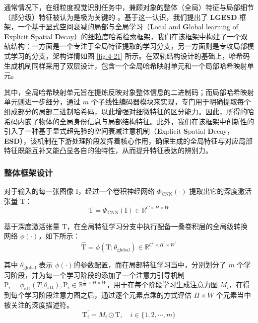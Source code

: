 通常情况下，在细粒度视觉识别任务中，兼顾对象的整体（全局）特征与局部细节（部分级）特征被认为是极为关键的 \cite{wei2021finegrained}。基于这一认识，我们提出了 \textbf{LGESD} 框架，一个基于显式空间衰减的局部与全局学习（\textbf{L}ocal and \textbf{G}lobal learning of \textbf{E}xplicit \textbf{S}patial \textbf{D}ecay）的细粒度哈希检索框架，我们在该框架中构建了一个双轨结构：一方面是一个专注于全局特征提取的学习分支，另一方面则是专攻局部模式学习的分支，架构详情如图 \ref{fig:4-21} 所示。在双轨结构设计的基础上，哈希码生成机制同样采用了双层设计，包含一个全局哈希映射单元和一个局部哈希映射单元。

其中，全局哈希映射单元旨在提炼反映对象整体信息的二进制码；而局部哈希映射单元则进一步细分，通过 $m$ 个子线性编码器模块来实现，专门用于明确提取每个组成部分的局部二进制哈希码，以此增强对细微特征的区分能力。因此，所得的哈希码内嵌了物体的全局身份信息与局部结构特征。此外，我们在该框架中创新性的引入了一种基于显式超先验的空间衰减注意机制（\textbf{E}xplicit \textbf{S}patial \textbf{D}ecay，\textbf{ESD}），该机制在下游处理阶段发挥着核心作用，确保生成的全局特征与对应局部特征既能互补又能凸显各自的独特性，从而提升特征表达的辨别力。

\subsubsection{整体框架设计}

对于输入的每一张图像 $\mathrm{I}$，经过一个卷积神经网络 $\Phi_{\mathrm{CNN}}(\cdot)$ 提取出它的深度激活张量 $\mathrm{T}$：
\begin{equation}
    \mathrm{T}=\Phi_{\mathrm{CNN}}(\mathrm{I})\in\mathbb{R}^{C\times H\times W}
\end{equation}

基于深度激活张量 $\mathrm{T}$，在全局特征学习分支中执行配备一叠卷积层的全局级转换网络 $\phi(\cdot)$，如下所示：
\begin{equation}
\hat{\mathrm{T}}=\phi(\mathrm{T};\theta_{\mathrm{global}})\in\mathbb{R}^{C^{\prime}\times H^{\prime}\times W^{\prime}}
\end{equation}

其中 $\theta_{\mathrm{global}}$ 表示 $\phi(\cdot)$的参数配置，而在局部特征学习当中，分别划分了 $m$ 个学习阶段，并为每一个学习阶段的添加了一个注意力引导机制 $\mathrm{P}_i = \phi_{\mathrm{att}}(T;\theta_{\mathrm{att}}), \mathrm{P}_i \in \mathbb{R}^{\frac{C}{m} \times H \times W}$，用于在每个阶段学习生成注意力图 $M_i$，在得到每个学习阶段注意力图之后，通过逐个元素点乘的方式评估 $H \times W$ 个元素当中被关注的深度描述符。
\begin{equation}
    \mathrm{T}_i^{\prime}=M_i\odot \mathrm{T}, \quad i \in \{1,2,\cdots,m \}
    \label{eq:eq_4_m}
\end{equation}

